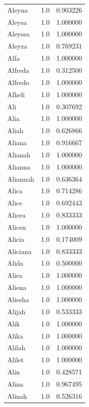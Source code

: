 \documentclass[
  letterpaper,
  DIV=11,
  numbers=noendperiod]{scrreprt}
\begin{document}
\begin{tabular}{lrr}
Aleyna          &   1.0 &   0.903226 \\
Aleysa          &   1.0 &   1.000000 \\
Aleyssa         &   1.0 &   1.000000 \\
Aleyza          &   1.0 &   0.769231 \\
Alfa            &   1.0 &   1.000000 \\
Alfreda         &   1.0 &   0.312500 \\
Alfredo         &   1.0 &   1.000000 \\
Alheli          &   1.0 &   1.000000 \\
Ali             &   1.0 &   0.307692 \\
Alia            &   1.0 &   1.000000 \\
Aliah           &   1.0 &   0.626866 \\
Aliana          &   1.0 &   0.916667 \\
Alianah         &   1.0 &   1.000000 \\
Alianna         &   1.0 &   1.000000 \\
Aliannah        &   1.0 &   0.636364 \\
Alica           &   1.0 &   0.714286 \\
Alice           &   1.0 &   0.692443 \\
Alicea          &   1.0 &   0.833333 \\
Alicen          &   1.0 &   1.000000 \\
Alicia          &   1.0 &   0.174009 \\
Aliciana        &   1.0 &   0.833333 \\
Alida           &   1.0 &   0.500000 \\
Aliea           &   1.0 &   1.000000 \\
Aliena          &   1.0 &   1.000000 \\
Aliesha         &   1.0 &   1.000000 \\
Alijah          &   1.0 &   0.533333 \\
Alik            &   1.0 &   1.000000 \\
Alika           &   1.0 &   1.000000 \\
Alilah          &   1.0 &   1.000000 \\
Alilet          &   1.0 &   1.000000 \\
Alin            &   1.0 &   0.428571 \\
Alina           &   1.0 &   0.967495 \\
Alinah          &   1.0 &   0.526316 \\

\end{tabular}
\end{document}
